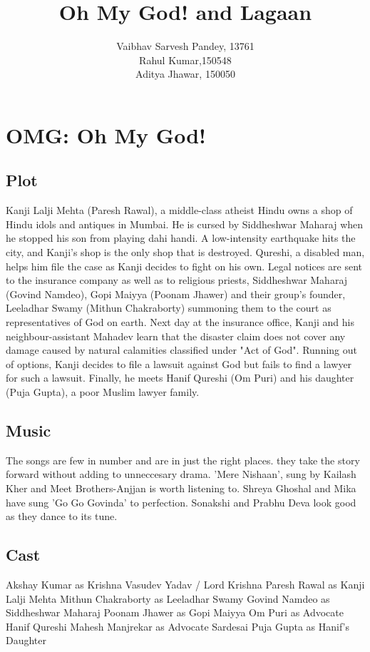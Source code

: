 \documentclass[a4paper]{article}
\title{Oh My God! and Lagaan}
\author{Vaibhav Sarvesh Pandey, 13761\\
	Rahul Kumar,150548\\
	Aditya Jhawar, 150050}
\begin{document}
	\maketitle
	

\section{OMG: Oh My God! }
\subsection{Plot}

Kanji Lalji Mehta (Paresh Rawal), a middle-class atheist Hindu owns a shop of Hindu idols and antiques in Mumbai. He is cursed by Siddheshwar Maharaj when he stopped his son from playing dahi handi. A low-intensity earthquake hits the city, and Kanji's shop is the only shop that is destroyed. Qureshi, a disabled man, helps him file the case as Kanji decides to fight on his own. Legal notices are sent to the insurance company as well as to religious priests, Siddheshwar Maharaj (Govind Namdeo), Gopi Maiyya (Poonam Jhawer) and their group's founder, Leeladhar Swamy (Mithun Chakraborty) summoning them to the court as representatives of God on earth.
Next day at the insurance office, Kanji and his neighbour-assistant Mahadev learn that the disaster claim does not cover any damage caused by natural calamities classified under "Act of God".   Running out of options, Kanji decides to file a lawsuit against God but fails to find a lawyer for such a lawsuit. Finally, he meets Hanif Qureshi (Om Puri) and his daughter (Puja Gupta), a poor Muslim lawyer family.
	
\subsection{Music }
The songs are few in number and are in just the right places. they take the story forward without adding to unneccesary drama. 'Mere Nishaan', sung by Kailash Kher and Meet Brothers-Anjjan is worth listening to. Shreya Ghoshal and Mika have sung 'Go Go Govinda' to perfection. Sonakshi and Prabhu Deva look good as they dance to its tune.   
  
	  \subsection{Cast}
	        
Akshay Kumar as Krishna Vasudev Yadav / Lord Krishna
Paresh Rawal as Kanji Lalji Mehta
Mithun Chakraborty as Leeladhar Swamy
Govind Namdeo as Siddheshwar Maharaj
Poonam Jhawer as Gopi Maiyya
Om Puri as Advocate Hanif Qureshi
Mahesh Manjrekar as Advocate Sardesai
Puja Gupta as Hanif's Daughter                  
	  
\end{document}
